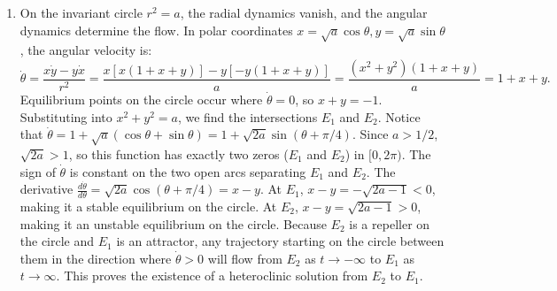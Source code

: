 \documentclass{article}
\begin{document}
\begin{enumerate}[label=\fbox{\arabic*}]
\begin{enumerate}[label=(\arabic*)]
          \item On the invariant circle $r^2 = a$, the radial dynamics vanish, and the angular dynamics determine the flow. In polar coordinates $x = \sqrt{a}\cos\theta, y = \sqrt{a}\sin\theta$, the angular velocity is:
          \[
            \dot{\theta} = \frac{x\dot{y} - y\dot{x}}{r^2} = \frac{x[x(1+x+y)] - y[-y(1+x+y)]}{a} = \frac{(x^2+y^2)(1+x+y)}{a} = 1 + x + y.
          \]
          Equilibrium points on the circle occur where $\dot{\theta} = 0$, so $x + y = -1$.
          Substituting into $x^2 + y^2 = a$, we find the intersections $E_1$ and $E_2$.
          Notice that $\dot{\theta} = 1 + \sqrt{a}(\cos\theta + \sin\theta) = 1 + \sqrt{2a}\sin(\theta + \pi/4)$. Since $a > 1/2$, $\sqrt{2a} > 1$, so this function has exactly two zeros ($E_1$ and $E_2$) in $[0, 2\pi)$.
          The sign of $\dot{\theta}$ is constant on the two open arcs separating $E_1$ and $E_2$. 
          The derivative $\frac{d\dot{\theta}}{d\theta} = \sqrt{2a}\cos(\theta + \pi/4) = x - y$.
          At $E_1$, $x - y = -\sqrt{2a - 1} < 0$, making it a stable equilibrium on the circle.
          At $E_2$, $x - y = \sqrt{2a - 1} > 0$, making it an unstable equilibrium on the circle.
          Because $E_2$ is a repeller on the circle and $E_1$ is an attractor, any trajectory starting on the circle between them in the direction where $\dot{\theta} > 0$ will flow from $E_2$ as $t \to -\infty$ to $E_1$ as $t \to \infty$. This proves the existence of a heteroclinic solution from $E_2$ to $E_1$.
          

\end{enumerate}
\end{enumerate}
\end{document}

